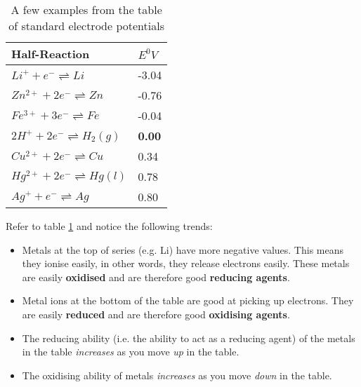 \begin{table}[h]
\begin{center}
\begin{tabular}{|l|l|}\hline 
\textbf{Half-Reaction}
&
\textbf{$E^{0}V$} \\ \hline\hline
$Li^{+} + e^{-} \rightleftharpoons Li$ & -3.04 \\ \hline
$Zn^{2+} + 2e^{-} \rightleftharpoons Zn $& -0.76 \\ \hline
$Fe^{3+} + 3e^{-} \rightleftharpoons Fe $& -0.04 \\ \hline
$2H^{+} + 2e^{-} \rightleftharpoons H_{2} (g) $& \textbf{0.00} \\ \hline
$Cu^{2+} + 2e^{-} \rightleftharpoons Cu $& 0.34 \\ \hline
$Hg^{2+} + 2e^{-} \rightleftharpoons Hg (l) $& 0.78 \\ \hline
$Ag^{+} + e^{-} \rightleftharpoons Ag $& 0.80 \\ \hline
\end{tabular}
\end{center}
\caption{A few examples from the table of standard electrode potentials}
\label{tab:electrochemical:table sep abbrev}
\end{table}

Refer to table \ref{tab:electrochemical:table sep abbrev} and notice the following trends:

\begin{itemize}
\item{Metals at the top of series (e.g. Li) have more negative values. This means they ionise easily, in other words, they release electrons easily. These metals are easily \textbf{oxidised} and are therefore good \textbf{reducing agents}.}
\item{Metal ions at the bottom of the table are good at picking up electrons. They are easily \textbf{reduced} and are therefore good \textbf{oxidising agents}.}
\item{The reducing ability (i.e. the ability to act as a reducing agent) of the metals in the table \textit{increases} as you move \textit{up} in the table.}
\item{The oxidising ability of metals \textit{increases} as you move \textit{down} in the table.}
\end{itemize}

